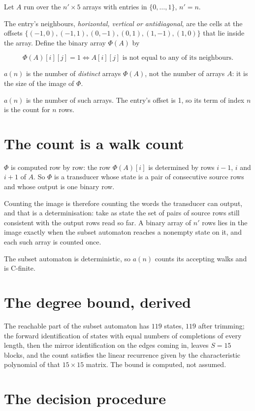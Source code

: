 \documentclass[11pt]{article}
\theoremstyle{definition}
\begin{document}
Let $A$ run over the $n' \times 5$ arrays with entries in $\{0,\dots,1\}$, $n' = n$.

The entry's neighbours, {\itshape horizontal, vertical or antidiagonal}, are the cells at the offsets $\{(-1,0), (-1,1), (0,-1), (0,1), (1,-1), (1,0)\}$ that lie inside the array. Define the binary array $\Phi(A)$ by

\[\Phi(A)[i][j] = 1 \iff A[i][j] \text{ is not equal to any of its neighbours}.\]

$a(n)$ is the number of {\itshape distinct} arrays $\Phi(A)$, not the number of arrays $A$: it is the size of the image of $\Phi$.

$a(n)$ is the number of such arrays. The entry's offset is 1, so its term of index $n$ is the count for $n$ rows.

\section{The count is a walk count}

$\Phi$ is computed row by row: the row $\Phi(A)[i]$ is determined by rows $i-1$, $i$ and $i+1$ of $A$. So $\Phi$ is a transducer whose state is a pair of consecutive source rows and whose output is one binary row.

Counting the image is therefore counting the words the transducer can output, and that is a determinisation: take as state the set of pairs of source rows still consistent with the output rows read so far. A binary array of $n'$ rows lies in the image exactly when the subset automaton reaches a nonempty state on it, and each such array is counted once.

The subset automaton is deterministic, so $a(n)$ counts its accepting walks and is C-finite.

\section{The degree bound, derived}

The reachable part of the subset automaton has $119$ states, $119$ after trimming; the forward identification of states with equal numbers of completions of every length, then the mirror identification on the edges coming in, leaves $S = 15$ blocks, and the count satisfies the linear recurrence given by the characteristic polynomial of that $15\times15$ matrix. The bound is computed, not assumed.

\section{The decision procedure}
\end{document}
